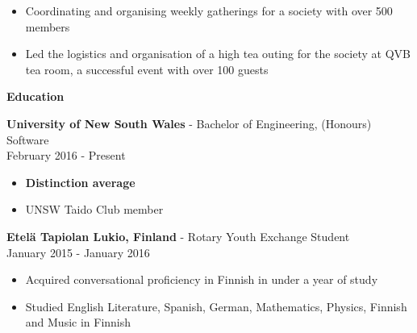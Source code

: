 \documentclass{article}
\newcommand{\minititle}[1]{{\Large \begin{center} \textbf{#1} \end{center}} \vspace{0.2cm}}
\newcommand{\resumeEntry}[3]{{\large \textbf{#1} - #2} \\ \small{#3} }
\begin{document}
\begin{minipage}[t]{0.6\linewidth}
{\begin{itemize}
            \setlength\itemsep{0.03cm}
            \item Coordinating and organising weekly gatherings for a society with over 500 members 
            \item Led the logistics and organisation of a high tea outing for the society at QVB tea room, a successful event with over 100 guests
        \end{itemize}
    }
    {
        \vspace{0.1cm}
        \minititle{Education}
        \resumeEntry{University of New South Wales}{Bachelor of Engineering, (Honours) Software}{February 2016 - Present}
        \begin{itemize}
            \setlength\itemsep{0.03cm}
            \item \textbf{Distinction average}
            \item UNSW Taido Club member
        \end{itemize}
        \vspace{0.4cm}
        \resumeEntry{Etel{\"a} Tapiolan Lukio, Finland}{Rotary Youth Exchange Student}{January 2015 - January 2016}
        \begin{itemize}
            \setlength\itemsep{0.03cm}
            \item Acquired conversational proficiency in Finnish in under a year of study
            \item Studied English Literature, Spanish, German, Mathematics, Physics, Finnish and Music in Finnish

        \end{itemize}
    }
\end{minipage}\hspace{1cm}
\end{document}
